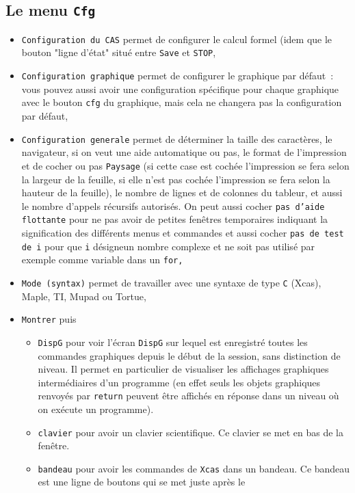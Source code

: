 \documentclass[a4paper,11pt]{article}
\begin{document}
\subsection{Le menu {\tt Cfg}}
\begin{itemize}
\item
{\tt Configuration du CAS} permet de configurer le calcul formel (idem que le 
bouton "ligne d'\'etat"  situ\'e entre {\tt Save} et {\tt STOP},
\item
{\tt Configuration graphique} permet de configurer le graphique par d\'efaut~: 
vous pouvez aussi avoir une configuration sp\'ecifique pour chaque graphique 
avec le bouton {\tt cfg} du graphique, mais cela ne changera pas la 
configuration par d\'efaut,
\item
{\tt Configuration generale} permet de d\'eterminer la taille des caract\`eres,
le navigateur, si on veut une aide automatique ou pas, le format de 
l'impression et de cocher ou pas {\tt Paysage} (si cette case est coch\'ee 
l'impression se fera selon la largeur de la feuille, si elle n'est pas coch\'ee
l'impression se fera selon la hauteur de la feuille), le nombre de lignes et
de colonnes du tableur, et aussi le nombre d'appels r\'ecursifs autoris\'es.
On peut aussi cocher {\tt pas d'aide flottante} pour ne pas avoir de petites
fen\^etres temporaires indiquant la signification des diff\'erents menus et 
commandes et aussi cocher {\tt pas de test de {\tt i}} pour que {\tt i} 
d\'esigneun nombre complexe et ne soit pas utilis\'e par exemple comme 
variable dans un {\tt for,}
\item
{\tt Mode (syntax)} permet de travailler avec une syntaxe de type {\tt C}
(Xcas), Maple, TI, Mupad ou Tortue,
\item
{\tt Montrer} puis 
\begin{itemize}
\item 
{\tt DispG} pour voir l'\'ecran {\tt DispG} sur lequel est 
enregistr\'e toutes les commandes graphiques
depuis le d\'ebut de la session, sans distinction de niveau. Il
permet en particulier de visualiser les affichages graphiques
interm\'ediaires d'un programme (en effet seuls les objets graphiques
renvoy\'es par {\tt return} peuvent \^etre affich\'es en
r\'eponse dans un niveau o\`u on ex\'ecute un programme).
\item 
{\tt clavier} pour avoir un clavier scientifique. Ce clavier se met 
en bas de la fen\^etre.
\item 
{\tt bandeau} pour avoir les commandes de {\tt Xcas} dans un 
bandeau. Ce bandeau est une ligne de boutons qui se met juste apr\`es le 

\end{itemize}
\end{itemize}
\end{document}
